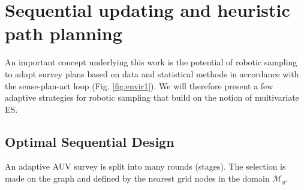\documentclass[aoas]{imsart}
\begin{document}





\section{Sequential updating and heuristic path planning}\label{sec:heuristics}

An important concept underlying this work is the potential of robotic
sampling to adapt survey plans based on data and statistical methods
in accordance with the sense-plan-act loop (Fig. \ref{fig:envir1}). We
will therefore present a few adaptive strategies for robotic sampling
that build on the notion of multivariate ES.

\subsection{Optimal Sequential Design}
\label{Optdes}

An adaptive AUV survey is split into many rounds (stages). The selection is made on the graph and defined by the nearest grid
nodes in the domain $\mathcal{M}_g$.
\end{document}
